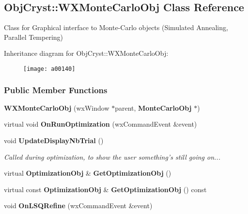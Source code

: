 \subsection{Obj\-Cryst\-:\-:W\-X\-Monte\-Carlo\-Obj Class Reference}
\label{a00140}


Class for Graphical interface to Monte-\/\-Carlo objects (Simulated Annealing, Parallel Tempering)  


Inheritance diagram for Obj\-Cryst\-:\-:W\-X\-Monte\-Carlo\-Obj\-:\begin{figure}[H]
\begin{center}
\leavevmode
\texttt{[image: a00140]}
\end{center}
\end{figure}
\subsubsection*{Public Member Functions}
\begin{DoxyCompactItemize}
\item 
{\bfseries W\-X\-Monte\-Carlo\-Obj} (wx\-Window $\ast$parent, {\bf Monte\-Carlo\-Obj} $\ast$)\label{a00140_a7f065d157d74531110e16c7d8081a95c}

\item 
virtual void {\bfseries On\-Run\-Optimization} (wx\-Command\-Event \&event)\label{a00140_a098a0d500afd4106725f308b4a5938a5}

\item 
void {\bf Update\-Display\-Nb\-Trial} ()\label{a00140_acbceaa3d0ad0a5936d79a4322eca4df3}

\begin{DoxyCompactList}\small\item\em Called during optimization, to show the user something's still going on... \end{DoxyCompactList}\item 
virtual {\bf Optimization\-Obj} \& {\bfseries Get\-Optimization\-Obj} ()\label{a00140_a82f53dc7990c736211df87a47c0104eb}

\item 
virtual const {\bf Optimization\-Obj} \& {\bfseries Get\-Optimization\-Obj} () const \label{a00140_a9d58c53f79b831360d3dc09eb8da5213}

\item 
void {\bfseries On\-L\-S\-Q\-Refine} (wx\-Command\-Event \&event)\label{a00140_aa7c362490aa3761ae1426f2fe111d622}

\end{DoxyCompactItemize}
